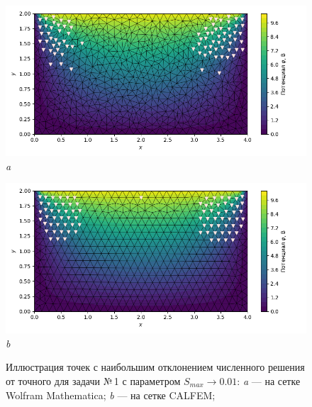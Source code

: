 \documentclass[12pt, a4paper]{article}
\begin{document}
			\newpage
			
			\begin{figure}[!h]  
				\centering     
				\vspace{5.0mm} 
				\begin{center} 
					{ 
						\begin{minipage}{0.45\textwidth} 
							\centering 
							\hspace*{-32.7mm}
							\includegraphics[width=1.4\columnwidth]{rect_dirichlet_only_001_err_nodes.png}\\ 
							\hspace*{-42.7mm}
							\textit{a} 
						\end{minipage}                                 
					} 
					{ 
						\begin{minipage}{0.45\textwidth} 
							\centering 
							\hspace*{-8.2mm}
							\includegraphics[width=1.4\columnwidth]{rect_dirichlet_only_001_calfem_err_nodes.png}\\
							\hspace*{2.2mm} 
							\textit{b} 
						\end{minipage}                                 
					} 
					
				\end{center} 
				\vspace*{-0.0mm} 
				\caption{Иллюстрация точек с наибольшим отклонением численного решения от точного для задачи №\,1 с параметром $S_{max} \rightarrow 0.01$: 
					\textit{a} --- на сетке Wolfram Mathematica;
					\textit{b} --- на сетке CALFEM;
				} 
				\label{fig: max_err_001}
			\end{figure}
			
\end{document}
